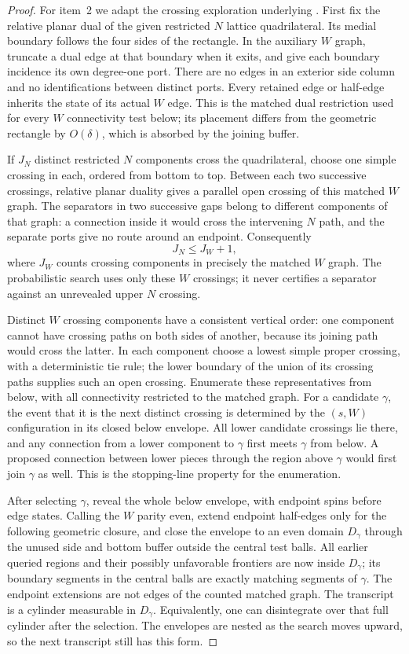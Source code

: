 \begin{proof}
For item~2 we adapt the crossing exploration underlying
\cite[Section~19.1, especially Lemmas~19.1 and~19.4]{DKLM2026}.
First fix the relative planar dual of the given restricted $N$
lattice quadrilateral. Its medial boundary follows the four sides
of the rectangle. In the auxiliary $W$ graph, truncate a dual edge
at that boundary when it exits, and give each boundary incidence
its own degree-one port. There are no edges in an exterior side
column and no identifications between distinct ports. Every retained
edge or half-edge inherits the state of its actual $W$ edge. This is the matched dual
restriction used for every $W$ connectivity test below; its
placement differs from the geometric rectangle by $O(\delta)$,
which is absorbed by the joining buffer.

If $J_N$ distinct restricted $N$ components cross the quadrilateral,
choose one simple crossing in each, ordered from bottom to top.
Between each two successive crossings, relative planar duality gives
a parallel open crossing of this matched $W$ graph. The separators
in two successive gaps belong to different components of that graph:
a connection inside it would cross the intervening $N$ path, and
the separate ports give no route around an endpoint. Consequently
\[
                  J_N\le J_W+1,
\]
where $J_W$ counts crossing components in precisely the matched
$W$ graph. The probabilistic search uses only these $W$ crossings;
it never certifies a separator against an unrevealed upper $N$ crossing.

Distinct $W$ crossing components have a consistent vertical order:
one component cannot have crossing paths on both sides of another,
because its joining path would cross the latter. In each component
choose a lowest simple proper crossing, with a deterministic tie
rule; the lower boundary of the union of its crossing paths supplies
such an open crossing. Enumerate these representatives from below,
with all connectivity restricted to the matched graph.
For a candidate $\gamma$, the event that it is the next distinct
crossing is determined by the $(s,W)$ configuration in its closed
below envelope. All lower candidate crossings lie there, and any
connection from a lower component to $\gamma$ first meets $\gamma$
from below. A proposed connection between lower pieces through the
region above $\gamma$ would first join $\gamma$ as well. This is
the stopping-line property for the enumeration.

After selecting $\gamma$, reveal the whole below envelope, with
endpoint spins before edge states. Calling the $W$ parity even,
extend endpoint half-edges only for the following geometric closure,
and close the envelope to an even domain $D_\gamma$ through the
unused side and bottom buffer outside the
central test balls. All earlier queried regions and their possibly
unfavorable frontiers are now inside $D_\gamma$; its boundary
segments in the central balls are exactly matching segments of
$\gamma$. The endpoint extensions are not edges of the counted
matched graph. The transcript is a cylinder measurable in $D_\gamma$.
Equivalently, one can disintegrate over that full cylinder after
the selection. The envelopes are nested as the search moves upward,
so the next transcript still has this form.


\end{proof}
